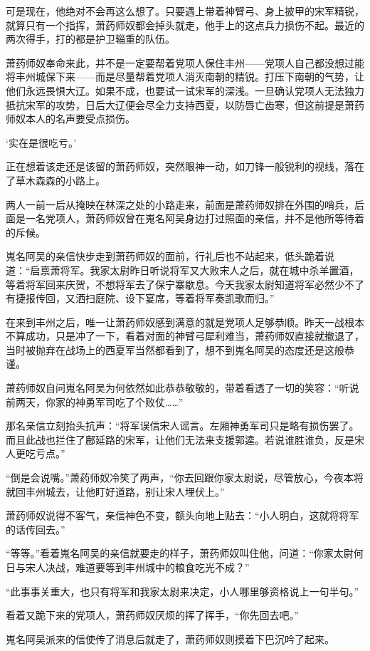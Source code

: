 可是现在，他绝对不会再这么想了。只要遇上带着神臂弓、身上披甲的宋军精锐，就算只有一个指挥，萧药师奴都会掉头就走，他手上的这点兵力损伤不起。最近的两次得手，打的都是护卫辎重的队伍。

萧药师奴奉命来此，并不是一定要帮着党项人保住丰州——党项人自己都没想过能将丰州城保下来——而是尽量帮着党项人消灭南朝的精锐。打压下南朝的气势，让他们永远畏惧大辽。如果不成，也要试一试宋军的深浅。一旦确认党项人无法独力抵抗宋军的攻势，日后大辽便会尽全力支持西夏，以防唇亡齿寒，但这前提是萧药师奴本人的名声要受点损伤。

‘实在是很吃亏。’

正在想着该走还是该留的萧药师奴，突然眼神一动，如刀锋一般锐利的视线，落在了草木森森的小路上。

两人一前一后从掩映在林深之处的小路走来，前面是萧药师奴排在外围的哨兵，后面是一名党项人，萧药师奴曾在嵬名阿吴身边打过照面的亲信，并不是他所等待着的斥候。

嵬名阿吴的亲信快步走到萧药师奴的面前，行礼后也不站起来，低头跪着说道：“启禀萧将军。我家太尉昨日听说将军又大败宋人之后，就在城中杀羊置酒，等着将军回来庆贺，不想将军去了保宁寨歇息。今天我家太尉知道将军必然少不了有捷报传回，又洒扫庭院、设下宴席，等着将军奏凯歌而归。”

在来到丰州之后，唯一让萧药师奴感到满意的就是党项人足够恭顺。昨天一战根本不算成功，只是冲了一下，看着对面的神臂弓犀利难当，萧药师奴直接就撤退了，当时被抛弃在战场上的西夏军当然都看到了，想不到嵬名阿吴的态度还是这般恭谨。

萧药师奴自问嵬名阿吴为何依然如此恭恭敬敬的，带着看透了一切的笑容：“听说前两天，你家的神勇军司吃了个败仗……”

那名亲信立刻抬头抗声：“将军误信宋人谣言。左厢神勇军司只是略有损伤罢了。而且此战也拦住了鄜延路的宋军，让他们无法来支援郭逵。若说谁胜谁负，反是宋人更吃亏点。”

“倒是会说嘴。”萧药师奴冷笑了两声，“你去回跟你家太尉说，尽管放心，今夜本将就回丰州城去，让他盯好道路，别让宋人埋伏上。”

萧药师奴说得不客气，亲信神色不变，额头向地上贴去：“小人明白，这就将将军的话传回去。”

“等等。”看着嵬名阿吴的亲信就要走的样子，萧药师奴叫住他，问道：“你家太尉何日与宋人决战，难道要等到丰州城中的粮食吃光不成？”

“此事事关重大，也只有将军和我家太尉来决定，小人哪里够资格说上一句半句。”

看着又跪下来的党项人，萧药师奴厌烦的挥了挥手，“你先回去吧。”

嵬名阿吴派来的信使传了消息后就走了，萧药师奴则摸着下巴沉吟了起来。

